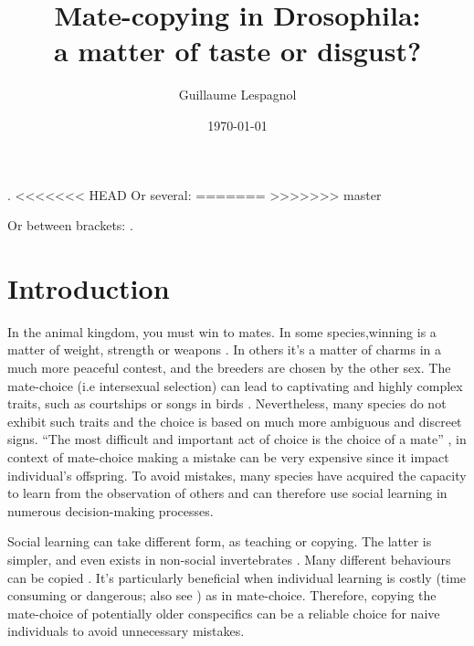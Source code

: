 \documentclass[a4paper, 12pt]{article}
\title{\Huge Mate-copying in Drosophila:\\ a matter of taste or disgust?}
\author{Guillaume Lespagnol}
\date{\today}
\begin{document}
	
	\maketitle
	
	\tableofcontents
	
	\bigskip
	
	
	\parencite[118]{danchin_cultural_2018}.
<<<<<<< HEAD
	Or several: \textcites[e.g.][118]{danchin_cultural_2018}[but see][1789]{danchin_cultural_2018}
=======
	\parencite{}
>>>>>>> master
	
	Or between brackets: \parencites{danchin_cultural_2018}[but see][1789]{dagaeff_drosophila_2016}.
	
	
	
	\section{Introduction}

	In the animal kingdom, you must win to mates. In some species,winning is a matter of weight, strength or weapons \parencite{anderson_grey_1985, clutton-brock_functions_1982}. In others it’s a matter of charms in a much more peaceful contest, and the breeders are chosen by the other sex.
	 The mate-choice (i.e intersexual selection) can lead to captivating and highly complex traits, such as courtships or songs in birds \parencite{danchin_ecologie_2005}. Nevertheless, many species do not exhibit such traits and the choice is based on much more ambiguous and discreet signs.
	“The most difficult and important act of choice is the choice of a mate” \parencite{fisher_evolution_1915}, in context of mate-choice making a mistake can be very expensive since it impact individual’s offspring.
	To avoid mistakes, many species have acquired the capacity to learn from the observation of others and can therefore use social learning in numerous decision-making processes.
	
	Social learning can take different form, as teaching or copying. The latter is simpler, and even exists in non-social invertebrates\parencite{coolen_social_2005,laidre_mark_e._how_2010} . Many different behaviours can be copied \parencite{thornton_alex_multi-generational_2010, van_leeuwen_group-specific_2014}.
	 It’s particularly beneficial when individual learning is costly (time consuming or dangerous; also see \parencite{webster_m.m_social_2008}) as in mate-choice.
	 Therefore, copying the mate-choice of potentially older conspecifics can be a reliable choice for naive individuals to avoid unnecessary mistakes.
	
\end{document}
